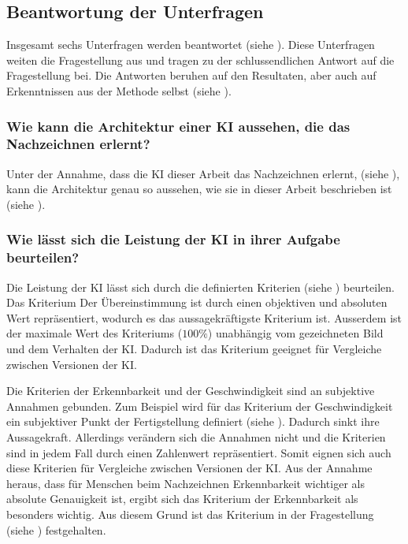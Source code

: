 \subsection{Beantwortung der Unterfragen}\label{sub:d_frage_unter}
Insgesamt sechs Unterfragen werden beantwortet (siehe ).
Diese Unterfragen weiten die Fragestellung aus und tragen zu der
schlussendlichen Antwort auf die Fragestellung bei. Die Antworten beruhen auf
den Resultaten, aber auch auf Erkenntnissen aus der Methode selbst (siehe
).

\subsubsection*{Wie kann die Architektur einer KI aussehen, die das Nachzeichnen erlernt?}\label{subsub:d_frage_unter_1}
Unter der Annahme, dass die KI dieser Arbeit das Nachzeichnen erlernt, (siehe
), kann die Architektur genau so aussehen, wie sie in
dieser Arbeit beschrieben ist (siehe ).

\subsubsection*{Wie lässt sich die Leistung der KI in ihrer Aufgabe
beurteilen?}\label{subsub:d_frage_unter_2} Die Leistung der KI lässt sich durch
die definierten Kriterien (siehe ) beurteilen. Das
Kriterium Der Übereinstimmung ist durch einen objektiven und absoluten Wert
repräsentiert, wodurch es das aussagekräftigste Kriterium ist. Ausserdem ist der
maximale Wert des Kriteriums ($100\%$) unabhängig vom gezeichneten Bild und dem
Verhalten der KI. Dadurch ist das Kriterium geeignet für Vergleiche zwischen
Versionen der KI.

Die Kriterien der Erkennbarkeit und der Geschwindigkeit sind an subjektive
Annahmen gebunden. Zum Beispiel wird für das Kriterium der Geschwindigkeit ein
subjektiver Punkt der Fertigstellung definiert (siehe
). Dadurch sinkt ihre Aussagekraft. Allerdings
verändern sich die Annahmen nicht und die Kriterien sind in jedem Fall durch
einen Zahlenwert repräsentiert. Somit eignen sich auch diese Kriterien für
Vergleiche zwischen Versionen der KI. Aus der Annahme heraus, dass für Menschen
beim Nachzeichnen Erkennbarkeit wichtiger als absolute Genauigkeit ist, ergibt
sich das Kriterium der Erkennbarkeit als besonders wichtig. Aus diesem Grund
ist das Kriterium in der Fragestellung (siehe )
festgehalten.


